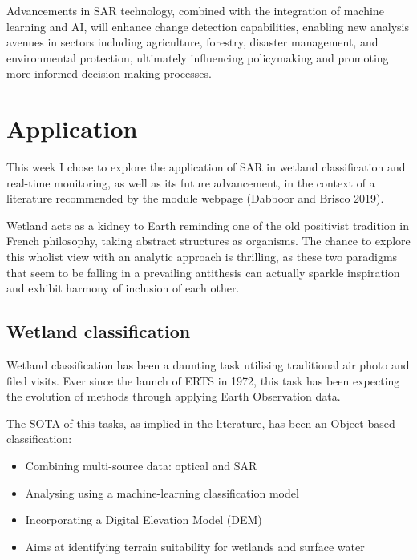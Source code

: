 \documentclass[
  letterpaper,
  DIV=11,
  numbers=noendperiod]{scrreprt}
\providecommand{\tightlist}{%
  \setlength{\itemsep}{0pt}\setlength{\parskip}{0pt}}\usepackage{longtable,booktabs,array}
\begin{document}
Advancements in SAR technology, combined with the integration of machine
learning and AI, will enhance change detection capabilities, enabling
new analysis avenues in sectors including agriculture, forestry,
disaster management, and environmental protection, ultimately
influencing policymaking and promoting more informed decision-making
processes.

\hypertarget{application-4}{%
\section{Application}\label{application-4}}

This week I chose to explore the application of SAR in wetland
classification and real-time monitoring, as well as its future
advancement, in the context of a literature recommended by the module
webpage (Dabboor and Brisco 2019).

Wetland acts as a kidney to Earth reminding one of the old positivist
tradition in French philosophy, taking abstract structures as organisms.
The chance to explore this wholist view with an analytic approach is
thrilling, as these two paradigms that seem to be falling in a
prevailing antithesis can actually sparkle inspiration and exhibit
harmony of inclusion of each other.

\hypertarget{wetland-classification}{%
\subsection{Wetland classification}\label{wetland-classification}}

Wetland classification has been a daunting task utilising traditional
air photo and filed visits. Ever since the launch of ERTS in 1972, this
task has been expecting the evolution of methods through applying Earth
Observation data.

The SOTA of this tasks, as implied in the literature, has been an
Object-based classification:

\begin{itemize}
\tightlist
\item
  Combining multi-source data: optical and SAR
\item
  Analysing using a machine-learning classification model
\item
  Incorporating a Digital Elevation Model (DEM)
\item
  Aims at identifying terrain suitability for wetlands and surface water
\end{itemize}
\end{document}
